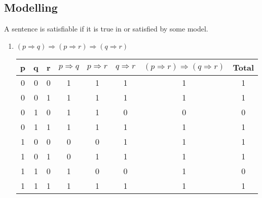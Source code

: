 \subsection{Modelling}
\begin{large}
  A sentence is satisfiable if it is true in or satisfied by some model.

  \begin{enumerate}[label=(\alph*)]
    \item $ (p \Rightarrow q) \Rightarrow (p \Rightarrow r) \Rightarrow ( q \Rightarrow r ) $

          \begin{tabular}{c|c|c|c|c|c|c||c}
            p & q & r & $ p \Rightarrow q $ & $ p \Rightarrow r $ & $ q \Rightarrow r $ & $ (p \Rightarrow r) \Rightarrow ( q \Rightarrow r ) $ & Total \\
            \hline \hline
            0 & 0 & 0 & 1                   & 1                   & 1                   & 1                                                     & 1     \\
            \hline
            0 & 0 & 1 & 1                   & 1                   & 1                   & 1                                                     & 1     \\
            \hline
            0 & 1 & 0 & 1                   & 1                   & 0                   & 0                                                     & 0     \\
            \hline
            0 & 1 & 1 & 1                   & 1                   & 1                   & 1                                                     & 1     \\
            \hline
            1 & 0 & 0 & 0                   & 0                   & 1                   & 1                                                     & 1     \\
            \hline
            1 & 0 & 1 & 0                   & 1                   & 1                   & 1                                                     & 1     \\
            \hline
            1 & 1 & 0 & 1                   & 0                   & 0                   & 1                                                     & 0     \\
            \hline
            1 & 1 & 1 & 1                   & 1                   & 1                   & 1                                                     & 1     \\
            \hline
          \end{tabular}


\end{enumerate}
\end{large}
